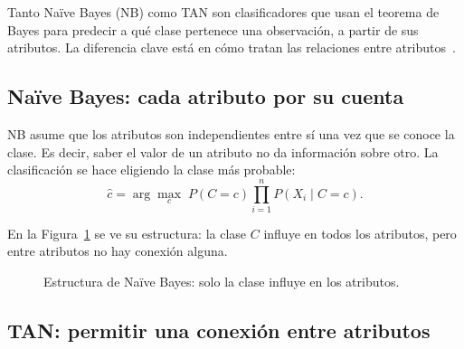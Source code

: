 
Tanto Naïve Bayes (NB) como TAN son clasificadores que usan el teorema de Bayes para predecir a qué clase pertenece una observación, a partir de sus atributos. La diferencia clave está en cómo tratan las relaciones entre atributos~\cite{friedman1997bayesian}.

\subsection{Naïve Bayes: cada atributo por su cuenta}

NB asume que los atributos son independientes entre sí una vez que se conoce la clase. Es decir, saber el valor de un atributo no da información sobre otro. La clasificación se hace eligiendo la clase más probable:
\begin{equation}
    \hat{c} = \arg\max_{c}\; P(C{=}c)\prod_{i=1}^{n} P(X_i \mid C{=}c).
    \label{eq:nb}
\end{equation}

En la Figura~\ref{fig:nb-structure} se ve su estructura: la clase $C$ influye en todos los atributos, pero entre atributos no hay conexión alguna.

\begin{figure}[H]
    \centering
    \caption{Estructura de Naïve Bayes: solo la clase influye en los atributos.}
    \label{fig:nb-structure}
\end{figure}

\subsection{TAN: permitir una conexión entre atributos}

